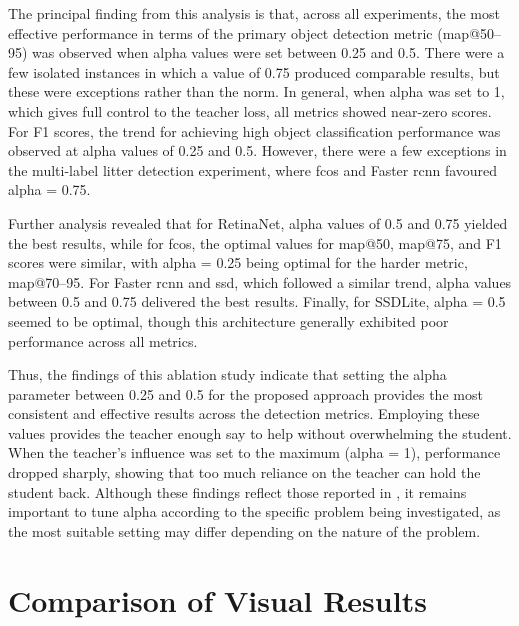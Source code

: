 The principal finding from this analysis is that, across all experiments, the most effective performance in terms of the primary object detection metric (\gls{map}@50–95) was observed when \gls{alpha} values were set between 0.25 and 0.5. There were a few isolated instances in which a value of 0.75 produced comparable results, but these were exceptions rather than the norm. In general, when \gls{alpha} was set to 1, which gives full control to the teacher loss, all metrics showed near-zero scores. For F1 scores, the trend for achieving high object classification performance was observed at \gls{alpha} values of 0.25 and 0.5. However, there were a few exceptions in the multi-label litter detection experiment, where \gls{fcos} and Faster \gls{rcnn} favoured \gls{alpha} = 0.75. 

Further analysis revealed that for RetinaNet, \gls{alpha} values of 0.5 and 0.75 yielded the best results, while for \gls{fcos}, the optimal values for \gls{map}@50, \gls{map}@75, and F1 scores were similar, with \gls{alpha} = 0.25 being optimal for the harder metric, \gls{map}@70–95. For Faster \gls{rcnn} and \gls{ssd}, which followed a similar trend, \gls{alpha} values between 0.5 and 0.75 delivered the best results. Finally, for SSDLite, \gls{alpha} = 0.5 seemed to be optimal, though this architecture generally exhibited poor performance across all metrics.

Thus, the findings of this ablation study indicate that setting the \gls{alpha} parameter between 0.25 and 0.5 for the proposed approach provides the most consistent and effective results across the detection metrics. Employing these values provides the teacher enough say to help without overwhelming the student. When the teacher’s influence was set to the maximum (\gls{alpha} = 1), performance dropped sharply, showing that too much reliance on the teacher can hold the student back. Although these findings reflect those reported in \cite{lab2wild}, it remains important to tune \gls{alpha} according to the specific problem being investigated, as the most suitable setting may differ depending on the nature of the problem.


\section{Comparison of Visual Results}
\label{sec:5_visual_results}

